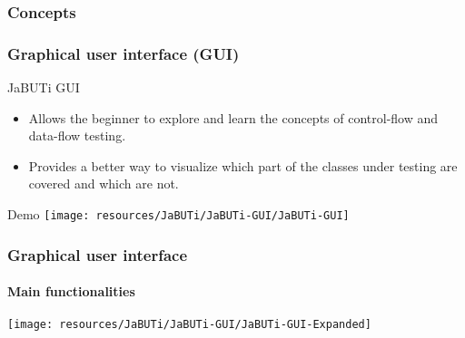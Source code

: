 \begin{frame}[parent={cmap:jabuti-software-testing},hasnext=true,hasprev=true]
\frametitle{Concepts}
\label{cmap:jabuti-gui}
\label{cmap:graphical-user-interface}
\label{cmap:gui}

\end{frame}


\begin{frame}[parent={cmap:jabuti-gui},hasnext=true,hasprev=true]
\frametitle{Graphical user interface (GUI)}
\label{concept:jabuti-gui}

\begin{block}{JaBUTi GUI}
\begin{itemize}
	\item Allows the beginner to explore and learn the concepts of
	control-flow and data-flow testing.

	\item Provides a better way to visualize which part of the classes
	under testing are covered and which are not.
\end{itemize}
\end{block}

\begin{block}{Demo}
\texttt{[image: resources/JaBUTi/JaBUTi-GUI/JaBUTi-GUI]}
\end{block}
\end{frame}


\begin{frame}[c]
\frametitle{Graphical user interface}
\framesubtitle{Main functionalities}
\label{concept:main-functionalities}

\vfill
\texttt{[image: resources/JaBUTi/JaBUTi-GUI/JaBUTi-GUI-Expanded]}
\vfill
\hfill
{}
\end{frame}

